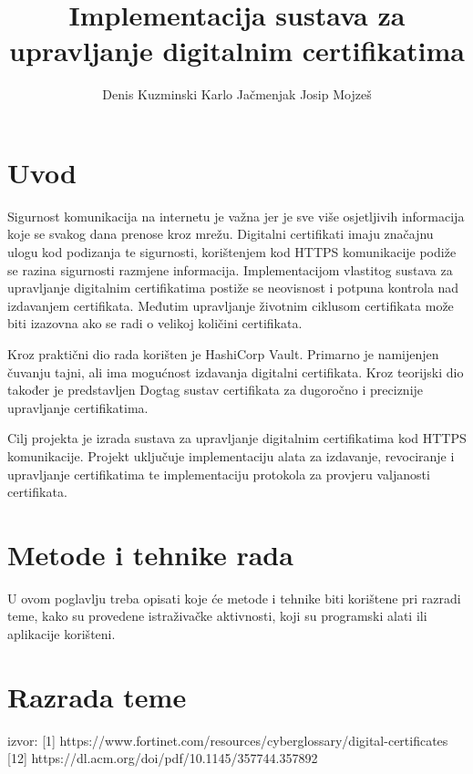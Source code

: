 \documentclass[]{foi}
\title{Implementacija sustava za upravljanje digitalnim certifikatima}
\author{Denis Kuzminski \newline Karlo Jačmenjak \newline Josip Mojzeš}
\begin{document}
\maketitle

\tableofcontents

\makeatletter {} \makeatother
\pagestyle{plain}

\chapter{Uvod}

Sigurnost komunikacija na internetu je važna jer je sve više osjetljivih informacija koje se svakog dana prenose kroz mrežu.
Digitalni certifikati imaju značajnu ulogu kod podizanja te sigurnosti, korištenjem kod HTTPS komunikacije podiže se razina sigurnosti razmjene informacija.
Implementacijom vlastitog sustava za upravljanje digitalnim certifikatima postiže se neovisnost i potpuna kontrola nad izdavanjem certifikata.
Međutim upravljanje životnim ciklusom certifikata može biti izazovna ako se radi o velikoj količini certifikata.

Kroz praktični dio rada korišten je HashiCorp Vault.
Primarno je namijenjen čuvanju tajni, ali ima mogućnost izdavanja digitalni certifikata.
Kroz teorijski dio također je predstavljen Dogtag sustav certifikata za dugoročno i preciznije upravljanje certifikatima.

Cilj projekta je izrada sustava za upravljanje digitalnim certifikatima kod HTTPS komunikacije.
Projekt uključuje implementaciju alata za izdavanje, revociranje i upravljanje certifikatima te implementaciju protokola za provjeru valjanosti certifikata.

\chapter{Metode i tehnike rada}

U ovom poglavlju treba opisati koje će metode i tehnike biti korištene pri razradi teme, kako su provedene istraživačke aktivnosti, koji su programski alati ili aplikacije korišteni.

\lipsum[1-2]



\chapter{Razrada teme}

\cite{fortinet-digital-certificates}
izvor: [1] https://www.fortinet.com/resources/cyberglossary/digital-certificates
[12] https://dl.acm.org/doi/pdf/10.1145/357744.357892
\end{document}
